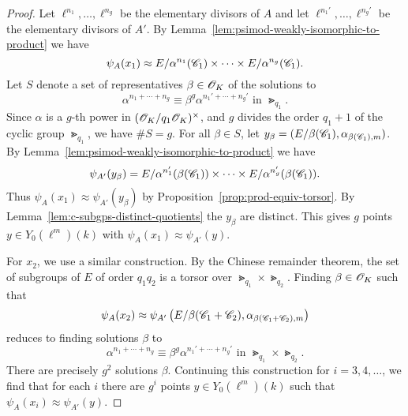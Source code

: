 \documentclass{amsart}
\begin{document}
\begin{proof}
Let $\ell^{n_1},\dots,\ell^{n_g}$ be the elementary divisors of $A$  and let $\ell^{n_1'},\dots,\ell^{n_g'}$ be the elementary divisors of $A'$.
By Lemma~\ref{lem:psimod-weakly-isomorphic-to-product} we have $$\psi_{A}(x_1) \approx E/\alpha^{n_1}(\mathscr{C}_1) \times \cdots \times E/\alpha^{n_g}(\mathscr{C}_1).$$
    Let $S$ denote a set of representatives $\beta \in \mathscr{O}_K$ of the solutions to %
    \[
      \alpha^{n_1 + \cdots + n_g} \equiv \beta^g\alpha^{n_1' + \cdots + n_g'}
      \text{ in } \Gt_{q_1}.
    \]
Since $\alpha$ is a $g$-th power in  $(\mathscr{O}_K/q_1\mathscr{O}_K)^\times$, and  $g$ divides the order $q_1 + 1$ of the cyclic group $\Gt_{q_1}$,
   we have $\#S = g$. For all $\beta \in S$, let $y_\beta = (E/\beta(\mathscr{C}_1),\alpha_{\beta(\mathscr{C}_1),m})$. By Lemma~\ref{lem:psimod-weakly-isomorphic-to-product} we have $$\psi_{A'}(y_\beta) = E/\alpha^{n_1'}(\beta(\mathscr{C}_1)) \times \cdots \times E/\alpha^{n_g'}(\beta(\mathscr{C}_1)).$$ Thus $\psi_A(x_1) \approx \psi_{A'}(y_\beta)$ by Proposition~\ref{prop:prod-equiv-torsor}. By Lemma~\ref{lem:c-subgps-distinct-quotients} the $y_\beta$ are distinct. This gives $g$ points $y \in Y_0(\ell^m)(k)$ with $\psi_{A}(x_1) \approx \psi_{A'}(y)$.

  For $x_2$, we use a similar construction. By the Chinese remainder theorem, the set of subgroups of $E$ of order $q_1q_2$ is a torsor over $\Gt_{q_1} \times \Gt_{q_2}$. Finding $\beta \in \mathscr{O}_K$ such that
  \[
    \psi_{A}(x_2) \approx \psi_{A'}\left(E/\beta(\mathscr{C}_1+\mathscr{C}_2),\alpha_{\beta(\mathscr{C}_1+\mathscr{C}_2),m}\right)
  \]
  reduces to finding solutions $\beta$ to %
  \[
    \alpha^{n_1 + \cdots + n_g} \equiv \beta^g\alpha^{n_1' + \cdots + n_g'}
    \text{ in } \Gt_{q_1} \times \Gt_{q_2}.
  \]
There are precisely $g^2$ solutions $\beta$. Continuing this construction for $i=3,4,\dots$, we find that for each $i$ there are $g^i$ points $y \in Y_0(\ell^m)(k)$ such that $\psi_{A}(x_i) \approx \psi_{A'}(y)$.
\end{proof}
\end{document}

